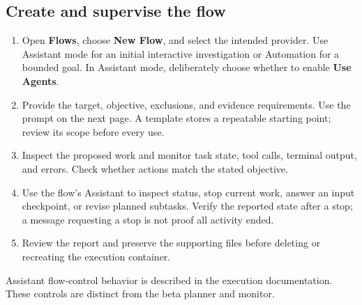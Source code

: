\documentclass[11pt,letterpaper]{article}
\newcommand{\src}[1]{\cite{#1}}
\begin{document}
\subsection{Create and supervise the flow}
\begin{enumerate}
\item Open \textbf{Flows}, choose \textbf{New Flow}, and select the intended
provider. Use Assistant mode for an initial interactive investigation or
Automation for a bounded goal. In Assistant mode, deliberately choose whether
to enable \textbf{Use Agents}. \src{readme}
\item Provide the target, objective, exclusions, and evidence requirements.
Use the prompt on the next page. A template stores a repeatable starting point;
review its scope before every use.
\item Inspect the proposed work and monitor task state, tool calls, terminal
output, and errors. Check whether actions match the stated objective.
\item Use the flow's Assistant to inspect status, stop current work, answer an
input checkpoint, or revise planned subtasks. Verify the reported state after a
stop; a message requesting a stop is not proof all activity ended.
\item Review the report and preserve the supporting files before deleting or
recreating the execution container.
\end{enumerate}
Assistant flow-control behavior is described in the execution documentation.
These controls are distinct from the beta planner and monitor.
\src{flow}

\clearpage
\end{document}

